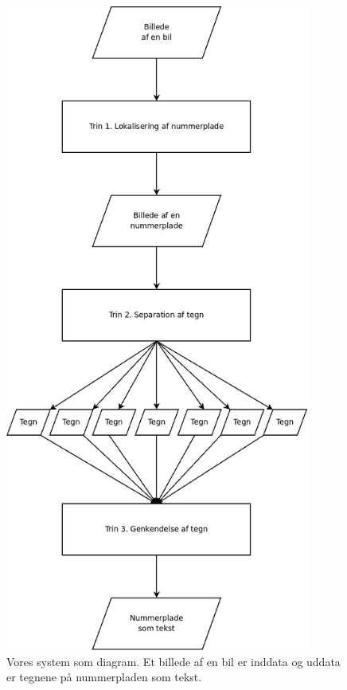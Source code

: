 \documentclass[11pt,a4paper,final]{article}
\begin{document}
\begin{figure}[htp]
\centering
\includegraphics[width=10cm]{system/illu/overordnet_system_2.png} 
\caption{Vores system som diagram. Et billede af en bil er inddata og uddata er tegnene på nummerpladen som tekst.}
\label{fig:system_overblik}
\end{figure}




\end{document}
